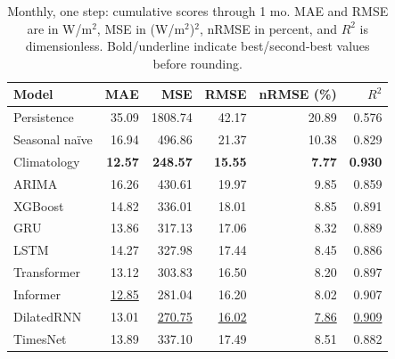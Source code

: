 \begin{table}[!htbp]
\centering
\small
\setlength{\tabcolsep}{6pt}
\caption{Monthly, one step: cumulative scores through 1 mo. MAE and RMSE are in W/m$^2$, MSE in (W/m$^2$)$^2$, nRMSE in percent, and $R^2$ is dimensionless. Bold/underline indicate best/second-best values before rounding.}
\label{tab:baseline_monthly_1_1}
\begin{tabular}{@{}lrrrrr@{}}
\toprule
Model & MAE & MSE & RMSE & nRMSE (\%) & $R^2$ \\
\midrule
Persistence & 35.09 & 1808.74 & 42.17 & 20.89 & 0.576 \\
Seasonal na\"ive & 16.94 & 496.86 & 21.37 & 10.38 & 0.829 \\
Climatology & \textbf{12.57} & \textbf{248.57} & \textbf{15.55} & \textbf{7.77} & \textbf{0.930} \\
ARIMA & 16.26 & 430.61 & 19.97 & 9.85 & 0.859 \\
XGBoost & 14.82 & 336.01 & 18.01 & 8.85 & 0.891 \\
GRU & 13.86 & 317.13 & 17.06 & 8.32 & 0.889 \\
LSTM & 14.27 & 327.98 & 17.44 & 8.45 & 0.886 \\
Transformer & 13.12 & 303.83 & 16.50 & 8.20 & 0.897 \\
Informer & \underline{12.85} & 281.04 & 16.20 & 8.02 & 0.907 \\
DilatedRNN & 13.01 & \underline{270.75} & \underline{16.02} & \underline{7.86} & \underline{0.909} \\
TimesNet & 13.89 & 337.10 & 17.49 & 8.51 & 0.882 \\
\bottomrule
\end{tabular}
\end{table}


